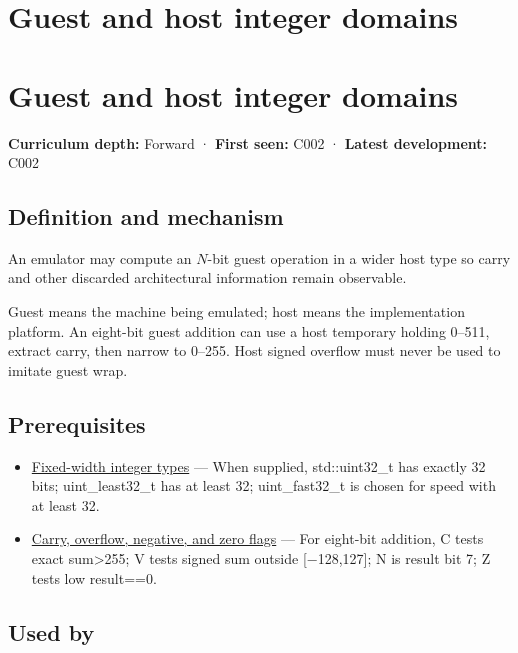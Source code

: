 \hypertarget{appendix-33e7a011b684}{}
\section*{Guest and host integer domains}
\section{Guest and host integer domains}\label{appendix-33e7a011b684-guest-and-host-integer-domains}

\textbf{Curriculum depth:} Forward · \textbf{First seen:} C002 · \textbf{Latest development:} C002

\subsection{Definition and mechanism}\label{appendix-33e7a011b684-definition-and-mechanism}

An emulator may compute an \(N\)-bit guest operation in a wider host type so carry and other discarded architectural information remain observable.

Guest means the machine being emulated; host means the implementation platform. An eight-bit guest addition can use a host temporary holding 0--511, extract carry, then narrow to 0--255. Host signed overflow must never be used to imitate guest wrap.

\subsection{Prerequisites}\label{appendix-33e7a011b684-prerequisites}

\begin{itemize}
\tightlist
\item
  \hyperref[appendix-cc04044b5782]{Fixed-width integer types} --- When supplied, std::uint32\_t has exactly 32 bits; uint\_least32\_t has at least 32; uint\_fast32\_t is chosen for speed with at least 32.
\item
  \hyperref[appendix-8d687c9c08ab]{Carry, overflow, negative, and zero flags} --- For eight-bit addition, C tests exact sum\textgreater255; V tests signed sum outside {[}−128,127{]}; N is result bit 7; Z tests low result==0.
\end{itemize}

\subsection{Used by}\label{appendix-33e7a011b684-used-by}

